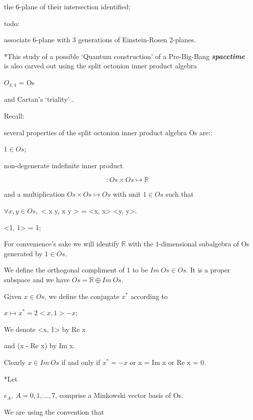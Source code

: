 \documentclass[10pt]{article}
\makeatletter
\newcommand\keepnext{\par\nopagebreak\@nobreaktrue\everypar{\@nobreakfalse\everypar{}}}
\newcommand\mdpart{\@startsection{section}{1}{\z@}{-3.5ex \@plus -1ex \@minus -.2ex}{2.3ex \@plus.2ex}{\normalfont\LARGE\bfseries\raggedright}}
\makeatother
\begin{document}
the 6-plane of their intersection identified;


todo:\keepnext


associate 6-plane with 3 generations of Einstein-Rosen 2-planes.




\mdpart*{This}
study of a possible `Quantum construction' of a Pre-Big-Bang \textbf{\emph{spacetime}} is also carved out using the split octonion inner product algebra


$O_{4,4}$ = Os\keepnext


and  Cartan's `triality' .


Recall:\keepnext


several properties of the split octonion inner product algebra Os are::\keepnext


$\displaystyle 1 \in Os$;\keepnext


non-degenerate indefinite inner product\keepnext


\[< , > : Os \times Os \mapsto \mathbb{R}\]

and a multiplication $Os \times Os \mapsto Os$ with unit $1 \in Os$ such that\keepnext


$\displaystyle \forall x, y \in Os, $ \textless{} x y,  x y \textgreater{} =  \textless{}x, x\textgreater{} \textless{}y, y\textgreater{}.



\textless{}1, 1\textgreater{} = 1;


For convenience's sake we will identify $\mathbb{R}$ with the 1-dimensional subalgebra of Os generated by $1 \in Os$.



We define the orthogonal compliment of 1 to be $Im \  Os \in Os$. It is a proper subspace and we have $\displaystyle Os = \mathbb{R} \oplus Im \  Os$.


Given $x \in Os$, we define the conjugate $x^*$ according to


$x \mapsto x^* = 2 <x, 1> - x$;\keepnext


We denote \textless{}x, 1\textgreater{} by Re x


and (x - Re x) by Im x.


Clearly $x \in Im \  Os$ if and only if $x^* = -x$ or x = Im x or Re x = 0.



\mdpart*{Let}

$e_A, \  A=0, 1, ..., 7$, comprise a Minkowski vector basis of Os.


We are using the convention that
\end{document}
